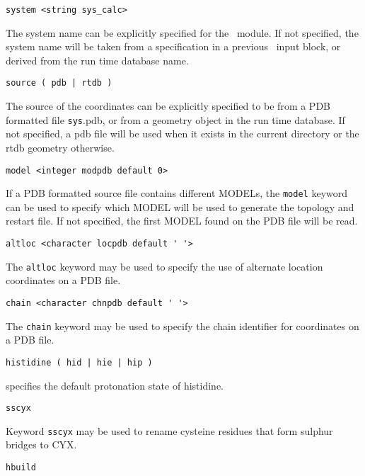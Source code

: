 \begin{verbatim}
system <string sys_calc>
\end{verbatim}

The system name can be explicitly specified for the \prepare\ module.
If not specified, the system name will be taken from a specification
in a previous \md\ input block, or derived from the run time database
name.

\begin{verbatim}
source ( pdb | rtdb )
\end{verbatim}

The source of the coordinates can be explicitly specified to be from
a PDB formatted file \verb+sys+.pdb, or from a geometry object in the run
time database. If not specified, a pdb file will be used when it exists
in the current directory or the rtdb geometry otherwise.

\begin{verbatim}
model <integer modpdb default 0>
\end{verbatim}

If a PDB formatted source file contains different MODELs, the \verb+model+
keyword can be used to specify which MODEL will be used to generate the
topology and restart file. If not specified, the first MODEL found on the
PDB file will be read.

\begin{verbatim}
altloc <character locpdb default ' '>
\end{verbatim}

The \verb+altloc+ keyword may be used to specify the use of alternate
location coordinates on a PDB file.

\begin{verbatim}
chain <character chnpdb default ' '>
\end{verbatim}

The \verb+chain+ keyword may be used to specify the chain identifier
for coordinates on a PDB file.

\begin{verbatim}
histidine ( hid | hie | hip )
\end{verbatim}
specifies the default protonation state of histidine.

\begin{verbatim}
sscyx
\end{verbatim}

Keyword \verb+sscyx+ may be used to rename cysteine residues that form
sulphur bridges to CYX.

\begin{verbatim}
hbuild
\end{verbatim}

